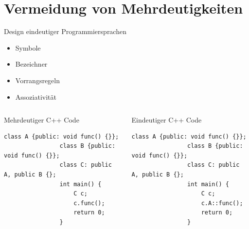\documentclass[t]{beamer}
\begin{document}
	\section{Vermeidung von Mehrdeutigkeiten}\label{sec:vermeidung-von-mehrdeutigkeiten}
	\begin{frame}[fragile]
		\begin{block}{Design eindeutiger Programmiersprachen}
			\begin{itemize}
				\item Symbole
				\item Bezeichner
				\item Vorrangsregeln
				\item Assoziativität
			\end{itemize}
		\end{block}
		\begin{columns}[T,onlytextwidth]
			\begin{exampleblock}{Mehrdeutiger C++ Code}
				\hspace*{-3em}
				\begin{minipage}{\textwidth+3em}
					\begin{lstlisting}[style=cppStyle,label={lst:lstlisting1}]
				class A {public: void func() {}};
				class B {public: void func() {}};
				class C: public A, public B {};
				int main() {
				    C c;
				    c.func();
				    return 0;
				}
					\end{lstlisting}
				\end{minipage}
			\end{exampleblock}
			\begin{exampleblock}{Eindeutiger C++ Code}
				\hspace*{-3em}
				\begin{minipage}{\textwidth+3em}
					\begin{lstlisting}[style=cppStyle,label={lst:lstlisting2}]
				class A {public: void func() {}};
				class B {public: void func() {}};
				class C: public A, public B {};
				int main() {
				    C c;
				    c.A::func();
				    return 0;
				}
					\end{lstlisting}
				\end{minipage}
			\end{exampleblock}
		\end{columns}
	\end{frame}
\end{document}
